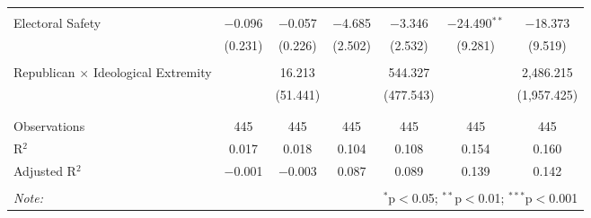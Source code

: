 \begin{tabular}{@{\extracolsep{5pt}}lcccccc}
  & & & & & & \\ 
 Electoral Safety & $-$0.096 & $-$0.057 & $-$4.685 & $-$3.346 & $-$24.490$^{**}$ & $-$18.373 \\ 
  & (0.231) & (0.226) & (2.502) & (2.532) & (9.281) & (9.519) \\ 
  & & & & & & \\ 
 Republican $\times$ Ideological Extremity &  & 16.213 &  & 544.327 &  & 2,486.215 \\ 
  &  & (51.441) &  & (477.543) &  & (1,957.425) \\ 
  & & & & & & \\ 
\hline \\[-1.8ex] 
Observations & 445 & 445 & 445 & 445 & 445 & 445 \\ 
R$^{2}$ & 0.017 & 0.018 & 0.104 & 0.108 & 0.154 & 0.160 \\ 
Adjusted R$^{2}$ & $-$0.001 & $-$0.003 & 0.087 & 0.089 & 0.139 & 0.142 \\ 
\hline 
\hline \\[-1.8ex] 
\textit{Note:}  & \multicolumn{6}{r}{$^{*}$p$<$0.05; $^{**}$p$<$0.01; $^{***}$p$<$0.001} \\ 
\end{tabular} 
